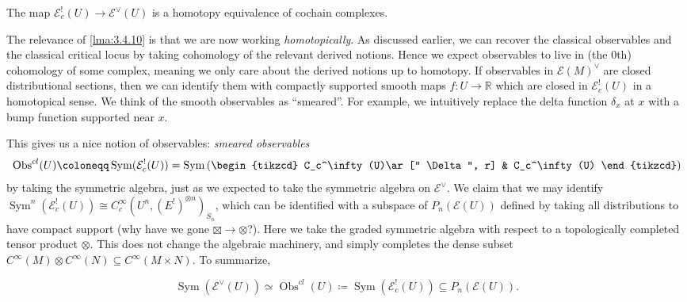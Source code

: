 \begin{example}
\begin{lemma}\label{lma:3.4.10}
	The map $\mathcal{E} _c^!(U)\to \mathcal{E} ^\vee (U)$ is a homotopy equivalence of cochain complexes.
\end{lemma}

The relevance of \cref{lma:3.4.10} is that we are now working \emph{homotopically}. As discussed earlier, we can recover the classical observables and the classical critical locus by taking cohomology of the relevant derived notions. Hence we expect observables to live in (the 0th) cohomology of some complex, meaning we only care about the derived notions up to homotopy. If observables in $\mathcal{E} (M)^\vee $ are closed distributional sections, then we can identify them with compactly supported smooth maps $f : U \to \mathbb{R} $ which are closed in $\mathcal{E} _c^!(U)$ in a homotopical sense. We think of the smooth observables as ``smeared''. For example, we intuitively replace the delta function $\delta_x$ at $x$ with a bump function supported near $x$.

This gives us a nice notion of observables: \emph{smeared observables}
\[
	\operatorname{Obs} ^{cl} (U)\coloneqq \operatorname{Sym} (\mathcal{E} _c^!(U)) = \operatorname{Sym} \left( 
		\begin{tikzcd}
			C_c^\infty (U)\ar[" \Delta  ", r] & C_c^\infty (U)
		\end{tikzcd}
	\right) 
\]
by taking the symmetric algebra, just as we expected to take the symmetric algebra on $\mathcal{E} ^\vee $. We claim that we may identify $\operatorname{Sym} ^n(\mathcal{E} _c^!(U))\cong C^\infty _c(U^n,(E^!)^{\otimes n} )_{S_n} $, which can be identified with a subspace of $P_n(\mathcal{E} (U))$ defined by taking all distributions to have compact support (why have we gone $\boxtimes \to \otimes $?). Here we take the graded symmetric algebra with respect to a topologically completed tensor product $\otimes $. This does not change the algebraic machinery, and simply completes the dense subset $C^\infty(M)\otimes C^\infty (N)\subseteq C^\infty (M\times N)$. To summarize,

\[
	\operatorname{Sym} (\mathcal{E} ^\vee (U))\simeq \operatorname{Obs} ^{cl} (U)\coloneqq \operatorname{Sym} (\mathcal{E} ^!_c(U)) \subseteq P_n(\mathcal{E} (U))
.\]



\end{example}
